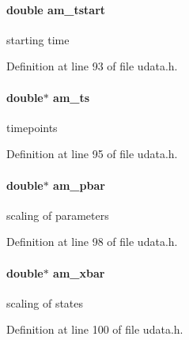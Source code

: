 \hypertarget{struct_user_data_a230439d483e6fde07a6fe687219060c2}{}
\paragraph[{am\+\_\+tstart}]{\setlength{\rightskip}{0pt plus 5cm}double am\+\_\+tstart}\label{struct_user_data_a230439d483e6fde07a6fe687219060c2}
starting time 

Definition at line 93 of file udata.\+h.

\hypertarget{struct_user_data_a368434a79bdb1655bef3adc552834ddc}{}
\paragraph[{am\+\_\+ts}]{\setlength{\rightskip}{0pt plus 5cm}double$\ast$ am\+\_\+ts}\label{struct_user_data_a368434a79bdb1655bef3adc552834ddc}
timepoints 

Definition at line 95 of file udata.\+h.

\hypertarget{struct_user_data_aa73d75cc02e28bcdf108cbea53e615e9}{}
\paragraph[{am\+\_\+pbar}]{\setlength{\rightskip}{0pt plus 5cm}double$\ast$ am\+\_\+pbar}\label{struct_user_data_aa73d75cc02e28bcdf108cbea53e615e9}
scaling of parameters 

Definition at line 98 of file udata.\+h.

\hypertarget{struct_user_data_ad21f2b82715b051daf2775ed059afdbb}{}
\paragraph[{am\+\_\+xbar}]{\setlength{\rightskip}{0pt plus 5cm}double$\ast$ am\+\_\+xbar}\label{struct_user_data_ad21f2b82715b051daf2775ed059afdbb}
scaling of states 

Definition at line 100 of file udata.\+h.

\hypertarget{struct_user_data_ab62bd78b1593ddbf3d854356b4dcaa0f}{}
